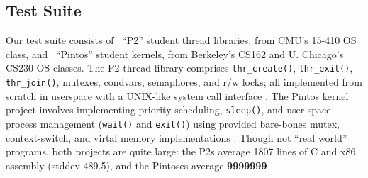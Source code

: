 
\subsection{Test Suite}
Our test suite consists of \numthrlibs~``P2'' student thread libraries, from CMU's 15-410 OS class,
and \numpintoses~``Pintos'' student kernels, from Berkeley's CS162 and U. Chicago's CS230 OS classes.
%
The P2 thread library comprises \texttt{thr\_create()}, \texttt{thr\_exit()}, \texttt{thr\_join()}, mutexes, condvars, semaphores, and r/w locks;
all implemented from scratch in userspace with a UNIX-like system call interface \cite{kspec,thrlib}.
%
The Pintos kernel project
involves implementing priority scheduling, \texttt{sleep()}, and user-space process management (\texttt{wait()} and \texttt{exit()})
using provided bare-bones mutex, context-switch, and virtal memory implementations
\cite{pintos}.
Though not ``real world'' programs, both projects are quite large: %
the P2s average 1807 lines of C and x86 assembly (stddev 489.5),
and the Pintoses average {\bf 9999999} %

